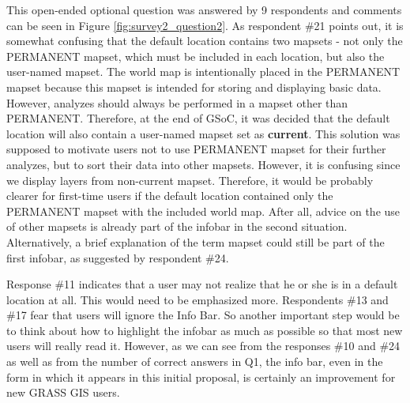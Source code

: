 \documentclass[a4paper,10pt,twoside]{article}
\begin{document}
\noindent This open-ended optional question was answered by 9
respondents and comments can be seen in Figure
\ref{fig:survey2_question2}. As respondent \#21 points out, it is
somewhat confusing that the default location contains two mapsets -
not only the PERMANENT mapset, which must be included in each
location, but also the user-named mapset. The world map is
intentionally placed in the PERMANENT mapset because this mapset is
intended for storing and displaying basic data. However, analyzes
should always be performed in a mapset other than
PERMANENT. Therefore, at the end of GSoC, it was decided that the
default location will also contain a user-named mapset set as
\textbf{current}. This solution was supposed to motivate users 
not to use PERMANENT mapset for their further analyzes, 
but to sort their data into other mapsets. However, it is confusing
since we display layers from non-current mapset.
Therefore, it would be probably clearer for first-time users if the default location
contained only the PERMANENT mapset with the included world map. After
all, advice on the use of other mapsets is already part of the infobar 
in the second situation. Alternatively, a brief explanation of the
term mapset could still be part of the first infobar, as suggested by
respondent \#24.

Response \#11 indicates that a user may not realize that he or she is
in a default location at all. This would need to be emphasized
more. Respondents \#13 and \#17 fear that users will ignore the Info
Bar. So another important step would be to think about how to
highlight the infobar as much as possible so that most new users will
really read it. However, as we can see from the responses \#10 and
\#24 as well as from the number of correct answers in Q1, the info
bar, even in the form in which it appears in this initial proposal, is
certainly an improvement for new GRASS GIS users.
\end{document}

